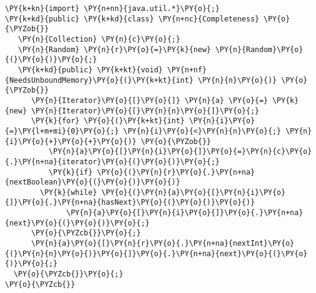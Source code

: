 \begin{Verbatim}[commandchars=\\\{\}]
\PY{k+kn}{import} \PY{n+nn}{java.util.*}\PY{o}{;}
\PY{k+kd}{public} \PY{k+kd}{class} \PY{n+nc}{Completeness} \PY{o}{\PYZob{}}
   \PY{n}{Collection} \PY{n}{c}\PY{o}{;}
   \PY{n}{Random} \PY{n}{r}\PY{o}{=}\PY{k}{new} \PY{n}{Random}\PY{o}{(}\PY{o}{)}\PY{o}{;}
   \PY{k+kd}{public} \PY{k+kt}{void} \PY{n+nf}{NeedsUnboundMemory}\PY{o}{(}\PY{k+kt}{int} \PY{n}{n}\PY{o}{)} \PY{o}{\PYZob{}}
      \PY{n}{Iterator}\PY{o}{[}\PY{o}{]} \PY{n}{a} \PY{o}{=} \PY{k}{new} \PY{n}{Iterator}\PY{o}{[}\PY{n}{n}\PY{o}{]}\PY{o}{;}
      \PY{k}{for} \PY{o}{(}\PY{k+kt}{int} \PY{n}{i}\PY{o}{=}\PY{l+m+mi}{0}\PY{o}{;} \PY{n}{i}\PY{o}{<}\PY{n}{n}\PY{o}{;} \PY{n}{i}\PY{o}{+}\PY{o}{+}\PY{o}{)} \PY{o}{\PYZob{}}
          \PY{n}{a}\PY{o}{[}\PY{n}{i}\PY{o}{]}\PY{o}{=}\PY{n}{c}\PY{o}{.}\PY{n+na}{iterator}\PY{o}{(}\PY{o}{)}\PY{o}{;}
          \PY{k}{if} \PY{o}{(}\PY{n}{r}\PY{o}{.}\PY{n+na}{nextBoolean}\PY{o}{(}\PY{o}{)}\PY{o}{)}
	    \PY{k}{while} \PY{o}{(}\PY{n}{a}\PY{o}{[}\PY{n}{i}\PY{o}{]}\PY{o}{.}\PY{n+na}{hasNext}\PY{o}{(}\PY{o}{)}\PY{o}{)}
              \PY{n}{a}\PY{o}{[}\PY{n}{i}\PY{o}{]}\PY{o}{.}\PY{n+na}{next}\PY{o}{(}\PY{o}{)}\PY{o}{;}
      \PY{o}{\PYZcb{}}\PY{o}{;}
      \PY{n}{a}\PY{o}{[}\PY{n}{r}\PY{o}{.}\PY{n+na}{nextInt}\PY{o}{(}\PY{n}{n}\PY{o}{)}\PY{o}{]}\PY{o}{.}\PY{n+na}{next}\PY{o}{(}\PY{o}{)}\PY{o}{;}
  \PY{o}{\PYZcb{}}\PY{o}{;}
\PY{o}{\PYZcb{}}
\end{Verbatim}
